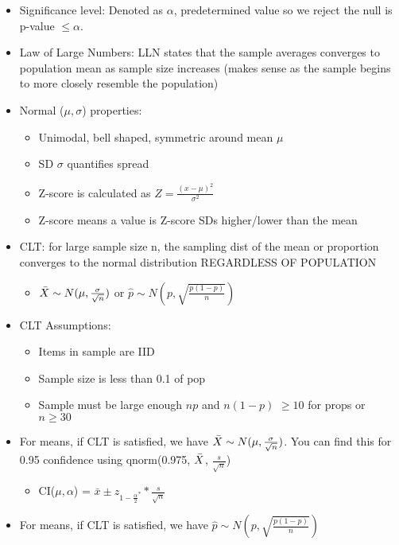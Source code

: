 \documentclass[8pt,landscape,a4paper, fleqn, dvipsnames]{extarticle}
\begin{document}
\begin{multicols*}{4}
\begin{itemize}
\begin{itemize}
\begin{itemize}
    \end{itemize}
    \item Significance level: Denoted as $\alpha$, predetermined value so we reject the null is p-value $\leq \alpha$.
    \item Law of Large Numbers: LLN states that the sample averages converges to population mean as sample size increases (makes sense as the sample begins to more closely resemble the population)
    \item Normal ($\mu, \sigma$) properties:
    \begin{itemize}
        \item Unimodal, bell shaped, symmetric around mean $\mu$
        \item SD $\sigma$ quantifies spread
        \item Z-score is calculated as $Z = \frac{(x - \mu)^2}{\sigma^2}$
        \item Z-score means a value is Z-score SDs higher/lower than the mean
    \end{itemize}
    \item CLT: for large sample size n, the sampling dist of the mean or proportion converges to the normal distribution REGARDLESS OF POPULATION
    \begin{itemize}
        \item $\Bar{X} \sim N(\mu, \frac{\sigma}{\sqrt{n}})$ or $\hat{p} \sim N(p, \sqrt{\frac{p(1 - p)}{n}})$
    \end{itemize}
    \item CLT Assumptions:
    \begin{itemize}
        \item Items in sample are IID
        \item Sample size is less than 0.1 of pop
        \item Sample must be large enough $np$ and $n(1 - p)$ $\geq 10$ for props or $n \geq 30$
    \end{itemize}
    \item For means, if CLT is satisfied, we have $\Bar{X} \sim N(\mu, \frac{\sigma}{\sqrt{n}})$. You can find this for 0.95 confidence using qnorm(0.975, $\Bar{X}$, $\frac{s}{\sqrt{n}}$)
    \begin{itemize}
        \item CI($\mu, \alpha$) = $\bar{x} \pm z_{1 - \frac{\alpha}{2}^{*}} * \frac{s}{\sqrt{n}}$
    \end{itemize}
    \item For means, if CLT is satisfied, we have $\hat{p} \sim N(p, \sqrt{\frac{p(1 - p)}{n}})$

\end{itemize}
\end{itemize}
\end{multicols*}
\end{document}
